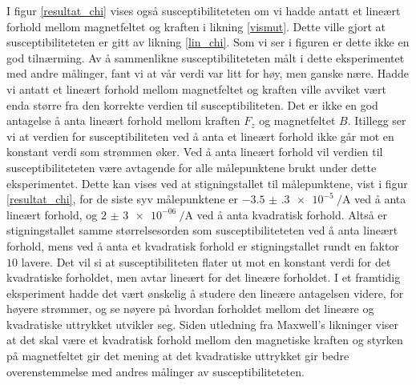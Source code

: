 \documentclass[%
 reprint,
 amsmath,amssymb,
 aps,
 norsk,
]{revtex4-1}
\begin{document}
I figur \vref{resultat_chi} vises også susceptibiliteteten om vi hadde antatt et lineært forhold mellom magnetfeltet og kraften i likning \eqref{vismut}. Dette ville gjort at susceptibiliteteten er gitt av likning \eqref{lin_chi}. Som vi ser i figuren er dette ikke en god tilnærming. Av å sammenlikne susceptibiliteteten målt i dette eksperimentet med andre målinger, fant vi at vår verdi var litt for høy, men ganske nære. Hadde vi antatt et lineært forhold mellom magnetfeltet og kraften ville avviket vært enda større fra den korrekte verdien til susceptibiliteten. Det er ikke en god antagelse å anta lineært forhold mellom kraften $F_z$ og magnetfeltet $B$. Itillegg ser vi at verdien for susceptibiliteten ved å anta et lineært forhold ikke går mot en konstant verdi som strømmen øker. Ved å anta lineært forhold vil verdien til susceptibiliteteten være avtagende for alle målepunktene brukt under dette eksperimentet. Dette kan vises ved at stigningstallet til målepunktene, vist i figur \vref{resultat_chi}, for de siste syv målepunktene er $\SI{-3.5(3)e-5}{\per\ampere}$ ved å anta lineært forhold, og $\SI{2(3)e-06}{\per\ampere}$ ved å anta kvadratisk forhold. Altså er stigningstallet samme størrelsesorden som susceptibiliteteten ved å anta lineært forhold, mens ved å anta et kvadratisk forhold er stigningstallet rundt en faktor $10$ lavere. Det vil si at susceptibiliteten flater ut mot en konstant verdi for det kvadratiske forholdet, men avtar lineært for det lineære forholdet.
I et framtidig eksperiment hadde det vært ønskelig å studere den lineære antagelsen videre, for høyere strømmer, og se nøyere på hvordan forholdet mellom det lineære og kvadratiske uttrykket utvikler seg. Siden utledning fra Maxwell's likninger viser at det skal være et kvadratisk forhold mellom den magnetiske kraften og styrken på magnetfeltet gir det mening at det kvadratiske uttrykket gir bedre overenstemmelse med andres målinger av susceptibiliteteten.
\par
\end{document}

